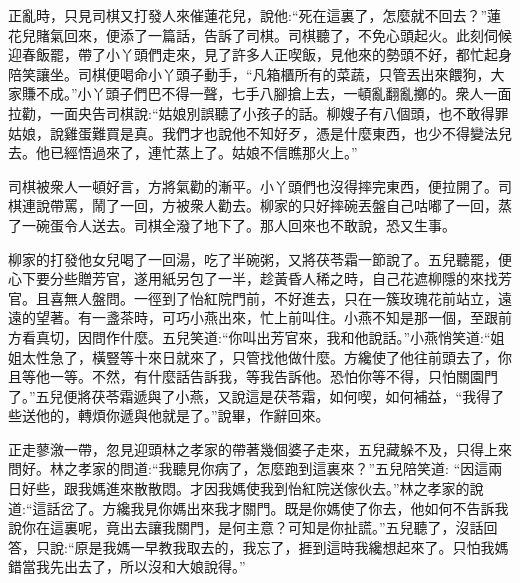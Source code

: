 \begin{parag}
    正亂時，只見司棋又打發人來催蓮花兒，說他:“死在這裏了，怎麼就不回去？”蓮花兒賭氣回來，便添了一篇話，告訴了司棋。司棋聽了，不免心頭起火。此刻伺候迎春飯罷，帶了小丫頭們走來，見了許多人正喫飯，見他來的勢頭不好，都忙起身陪笑讓坐。司棋便喝命小丫頭子動手，“凡箱櫃所有的菜蔬，只管丟出來餵狗，大家賺不成。”小丫頭子們巴不得一聲，七手八腳搶上去，一頓亂翻亂擲的。衆人一面拉勸，一面央告司棋說:“姑娘別誤聽了小孩子的話。柳嫂子有八個頭，也不敢得罪姑娘，說雞蛋難買是真。我們才也說他不知好歹，憑是什麼東西，也少不得變法兒去。他已經悟過來了，連忙蒸上了。姑娘不信瞧那火上。”
\end{parag}


\begin{parag}
    司棋被衆人一頓好言，方將氣勸的漸平。小丫頭們也沒得摔完東西，便拉開了。司棋連說帶罵，鬧了一回，方被衆人勸去。柳家的只好摔碗丟盤自己咕嘟了一回，蒸了一碗蛋令人送去。司棋全潑了地下了。那人回來也不敢說，恐又生事。
\end{parag}


\begin{parag}
    柳家的打發他女兒喝了一回湯，吃了半碗粥，又將茯苓霜一節說了。五兒聽罷，便心下要分些贈芳官，遂用紙另包了一半，趁黃昏人稀之時，自己花遮柳隱的來找芳官。且喜無人盤問。一徑到了怡紅院門前，不好進去，只在一簇玫瑰花前站立，遠遠的望著。有一盞茶時，可巧小燕出來，忙上前叫住。小燕不知是那一個，至跟前方看真切，因問作什麼。五兒笑道:“你叫出芳官來，我和他說話。”小燕悄笑道:“姐姐太性急了，橫豎等十來日就來了，只管找他做什麼。方纔使了他往前頭去了，你且等他一等。不然，有什麼話告訴我，等我告訴他。恐怕你等不得，只怕關園門了。”五兒便將茯苓霜遞與了小燕，又說這是茯苓霜，如何喫，如何補益，“我得了些送他的，轉煩你遞與他就是了。”說畢，作辭回來。
\end{parag}


\begin{parag}
    正走蓼漵一帶，忽見迎頭林之孝家的帶著幾個婆子走來，五兒藏躲不及，只得上來問好。林之孝家的問道:“我聽見你病了，怎麼跑到這裏來？”五兒陪笑道: “因這兩日好些，跟我媽進來散散悶。才因我媽使我到怡紅院送傢伙去。”林之孝家的說道:“這話岔了。方纔我見你媽出來我才關門。既是你媽使了你去，他如何不告訴我說你在這裏呢，竟出去讓我關門，是何主意？可知是你扯謊。”五兒聽了，沒話回答，只說:“原是我媽一早教我取去的，我忘了，捱到這時我纔想起來了。只怕我媽錯當我先出去了，所以沒和大娘說得。”
\end{parag}


